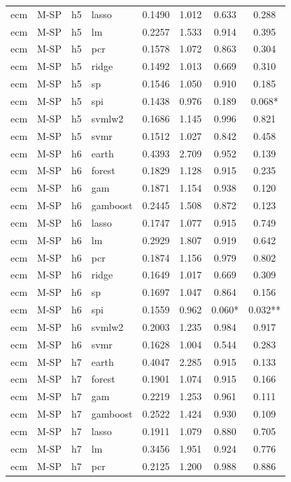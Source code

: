 \begin{ThreePartTable}
\begin{longtable}[t]{llclcccc}
ecm & M-SP & h5 & lasso & 0.1490 & 1.012 & 0.633 & 0.288\\
ecm & M-SP & h5 & lm & 0.2257 & 1.533 & 0.914 & 0.395\\
ecm & M-SP & h5 & pcr & 0.1578 & 1.072 & 0.863 & 0.304\\
ecm & M-SP & h5 & ridge & 0.1492 & 1.013 & 0.669 & 0.310\\
ecm & M-SP & h5 & sp & 0.1546 & 1.050 & 0.910 & 0.185\\
ecm & M-SP & h5 & spi & 0.1438 & 0.976 & 0.189 & 0.068*\\
ecm & M-SP & h5 & svmlw2 & 0.1686 & 1.145 & 0.996 & 0.821\\
ecm & M-SP & h5 & svmr & 0.1512 & 1.027 & 0.842 & 0.458\\
\addlinespace
ecm & M-SP & h6 & earth & 0.4393 & 2.709 & 0.952 & 0.139\\
ecm & M-SP & h6 & forest & 0.1829 & 1.128 & 0.915 & 0.235\\
ecm & M-SP & h6 & gam & 0.1871 & 1.154 & 0.938 & 0.120\\
ecm & M-SP & h6 & gamboost & 0.2445 & 1.508 & 0.872 & 0.123\\
ecm & M-SP & h6 & lasso & 0.1747 & 1.077 & 0.915 & 0.749\\
ecm & M-SP & h6 & lm & 0.2929 & 1.807 & 0.919 & 0.642\\
ecm & M-SP & h6 & pcr & 0.1874 & 1.156 & 0.979 & 0.802\\
ecm & M-SP & h6 & ridge & 0.1649 & 1.017 & 0.669 & 0.309\\
ecm & M-SP & h6 & sp & 0.1697 & 1.047 & 0.864 & 0.156\\
ecm & M-SP & h6 & spi & 0.1559 & 0.962 & 0.060* & 0.032**\\
ecm & M-SP & h6 & svmlw2 & 0.2003 & 1.235 & 0.984 & 0.917\\
ecm & M-SP & h6 & svmr & 0.1628 & 1.004 & 0.544 & 0.283\\
\addlinespace
ecm & M-SP & h7 & earth & 0.4047 & 2.285 & 0.915 & 0.133\\
ecm & M-SP & h7 & forest & 0.1901 & 1.074 & 0.915 & 0.166\\
ecm & M-SP & h7 & gam & 0.2219 & 1.253 & 0.961 & 0.111\\
ecm & M-SP & h7 & gamboost & 0.2522 & 1.424 & 0.930 & 0.109\\
ecm & M-SP & h7 & lasso & 0.1911 & 1.079 & 0.880 & 0.705\\
ecm & M-SP & h7 & lm & 0.3456 & 1.951 & 0.924 & 0.776\\
ecm & M-SP & h7 & pcr & 0.2125 & 1.200 & 0.988 & 0.886\\

\end{longtable}
\end{ThreePartTable}
